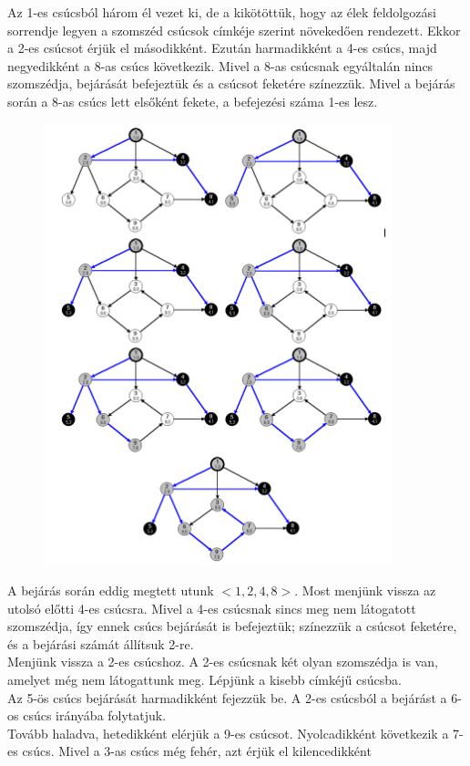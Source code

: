 \documentclass[margin=0px]{article}
\begin{document}
    \noindent Az 1-es csúcsból három él vezet ki, de a kikötöttük, hogy az élek feldolgozási sorrendje legyen a szomszéd csúcsok címkéje szerint növekedően rendezett. Ekkor a 2-es csúcsot érjük el másodikként. Ezután harmadikként a 4-es csúcs, majd negyedikként a 8-as csúcs következik. Mivel a 8-as csúcsnak egyáltalán nincs szomszédja, bejárását befejeztük és a csúcsot feketére színezzük. Mivel a bejárás során a 8-as csúcs lett elsőként fekete, a befejezési száma 1-es lesz.

	\begin{figure}[H]
		\centering
		\includegraphics[width=0.9\textwidth]{img/melysegi_2.png}
		\label{fig:melysegi_pelda_2}
	\end{figure}

    \noindent A bejárás során eddig megtett utunk $<1,2,4,8>$. Most menjünk vissza az utolsó előtti 4-es csúcsra. Mivel a 4-es csúcsnak sincs meg nem látogatott szomszédja, így ennek csúcs bejárását is befejeztük; színezzük a csúcsot feketére, és a bejárási számát állítsuk 2-re.\\
    Menjünk vissza a 2-es csúcshoz. A 2-es csúcsnak két olyan szomszédja is van, amelyet még nem látogattunk meg. Lépjünk a kisebb címkéjű csúcsba.\\
    Az 5-ös csúcs bejárását harmadikként fejezzük be. A 2-es csúcsból a bejárást a 6-os csúcs irányába folytatjuk.\\
    Tovább haladva, hetedikként elérjük a 9-es csúcsot. Nyolcadikként következik a 7-es csúcs. Mivel a 3-as csúcs még fehér, azt érjük el kilencedikként
\end{document}
